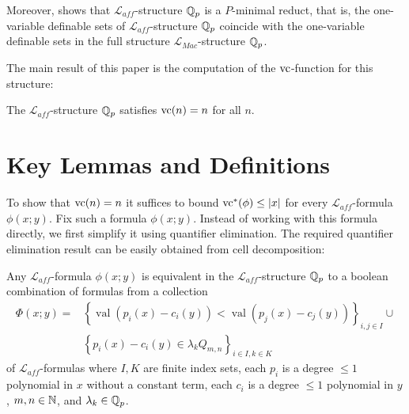 \documentclass{amsart}
\renewcommand{\LL}{\mathcal L}
\newcommand{\LLA}{\mathcal L_{aff}}
\newcommand{\LLM}{\mathcal L_{Mac}}
\newcommand{\curly}[1]{\left\{#1\right\}}
\DeclareMathOperator{\vval}{val}
\begin{document}
Moreover, \cite{reduct} shows that $\LLA$-structure $\mathbb{Q}_p$ is a $P$-minimal reduct,
that is, the one-variable definable sets of $\LLA$-structure $\mathbb{Q}_p$
coincide with the one-variable definable sets in the full structure $\LLM$-structure $\mathbb{Q}_p$.

The main result of this paper is the computation of the $\operatorname{vc}$-function for this structure:
\begin{Theorem} \label{main_theorem}
  The $\LLA$-structure $\mathbb{Q}_p$ satisfies $\operatorname{vc}(n) = n$ for all $n$.
\end{Theorem}


\section{Key Lemmas and Definitions}




To show that $\operatorname{vc}(n) = n$ it suffices to bound $\operatorname{vc}^*(\phi) \leq |x|$ for every $\LL_{aff}$-formula $\phi(x; y)$.
Fix such a formula $\phi(x; y)$.
Instead of working with this formula directly, we first simplify it using quantifier elimination.
The required quantifier elimination result can be easily obtained from cell decomposition:
\begin{Lemma} \label {quantifier_elimination}
  Any $\LLA$-formula $\phi(x; y)$ is equivalent in the $\LLA$-structure $\mathbb{Q}_p$ to a boolean combination of formulas from a collection
  \begin{align*}
    \Phi(x; y) = &\curly{\vval (p_i(x) - c_i(y)) < \vval (p_j(x) - c_j(y))}_{i, j \in I} \cup \\
                 &\curly{p_i(x) - c_i(y) \in \lambda_k Q_{m,n}}_{i \in I , k \in K}
  \end{align*}
  of $\LLA$-formulas
  where $I, K$ are finite index sets,
  each $p_i$ is a degree $\leq 1$ polynomial in $x$ without a constant term,
  each $c_i$ is a degree $\leq 1$ polynomial in $y$,
  $m,n \in \mathbb{N}$,
  and
  $\lambda_k \in \mathbb{Q}_p$.
\end{Lemma}
\end{document}
